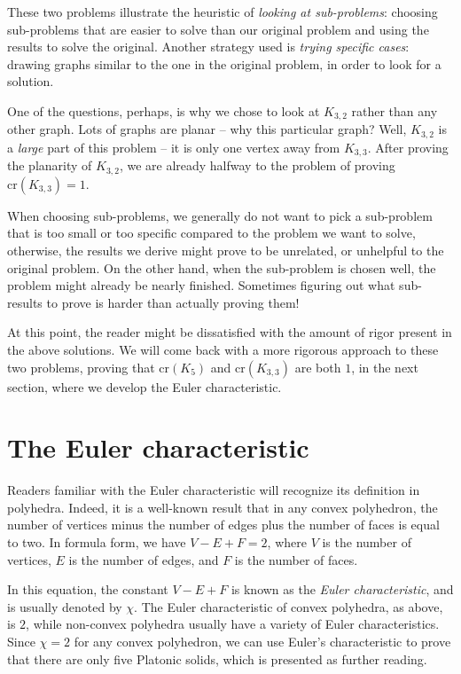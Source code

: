 \documentclass[11pt,paper=letter]{scrartcl}
\newcommand{\crs}[1]{\mathrm{cr}(#1)}
\begin{document}
These two problems illustrate the heuristic of \emph{looking at sub-problems}: choosing sub-problems that are easier to solve than our original problem and using the results to solve the original. Another strategy used is \emph{trying specific cases}: drawing graphs similar to the one in the original problem, in order to look for a solution.

One of the questions, perhaps, is why we chose to look at $K_{3,2}$ rather than any other graph. Lots of graphs are planar -- why this particular graph? Well, $K_{3,2}$ is a \emph{large} part of this problem -- it is only one vertex away from $K_{3,3}$. After proving the planarity of $K_{3,2}$, we are already halfway to the problem of proving $\crs{K_{3,3}} = 1$.

When choosing sub-problems, we generally do not want to pick a sub-problem that is too small or too specific compared to the problem we want to solve, otherwise, the results we derive might prove to be unrelated, or unhelpful to the original problem. On the other hand, when the sub-problem is chosen well, the problem might already be nearly finished. Sometimes figuring out what sub-results to prove is harder than actually proving them!

At this point, the reader might be dissatisfied with the amount of rigor present in the above solutions. We will come back with a more rigorous approach to these two problems, proving that $\crs{K_5}$ and $\crs{K_{3,3}}$ are both $1$, in the next section, where we develop the Euler characteristic.

\section{The Euler characteristic}

Readers familiar with the Euler characteristic will recognize its definition in polyhedra. Indeed, it is a well-known result that in any convex polyhedron, the number of vertices minus the number of edges plus the number of faces is equal to two. In formula form, we have $V - E + F = 2$, where $V$ is the number of vertices, $E$ is the number of edges, and $F$ is the number of faces.

In this equation, the constant $V - E + F$ is known as the \emph{Euler characteristic}, and is usually denoted by $\chi$. The Euler characteristic of convex polyhedra, as above, is $2$, while non-convex polyhedra usually have a variety of Euler characteristics. Since $\chi = 2$ for any convex polyhedron, we can use Euler's characteristic to prove that there are only five Platonic solids, which is presented as further reading. \cite{fleck}
\end{document}
